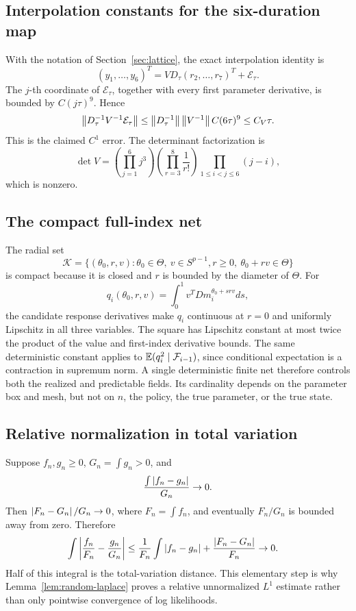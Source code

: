 \subsection{Interpolation constants for the six-duration map}

With the notation of Section~\ref{sec:lattice}, the exact interpolation
identity is
\[
 (y_1,\ldots,y_6)^T
 =VD_\tau(r_2,\ldots,r_7)^T+\mathcal E_\tau.
\]
The \(j\)-th coordinate of \(\mathcal E_\tau\), together with every first
parameter derivative, is bounded by \(C(j\tau)^9\).  Hence
\[
 \left\|D_\tau^{-1}V^{-1}\mathcal E_\tau\right\|
 \le \left\|D_\tau^{-1}\right\|\left\|V^{-1}\right\|C(6\tau)^9
 \le C_V\tau.
\]
This is the claimed \(C^1\) error.  The determinant factorization is
\[
 \det V=\left(\prod_{j=1}^6j^3\right)
 \left(\prod_{r=3}^8\frac1{r!}\right)
 \prod_{1\le i<j\le6}(j-i),
\]
which is nonzero.

\subsection{The compact full-index net}

The radial set
\[
 \mathscr K=\{(\theta_0,r,v):\theta_0\in\Theta,\ v\in S^{p-1},
 r\ge0,\ \theta_0+rv\in\Theta\}
\]
is compact because it is closed and \(r\) is bounded by the diameter of
\(\Theta\).  For
\[
 q_i(\theta_0,r,v)=\int_0^1v^TDm_i^{\theta_0+srv}ds,
\]
the candidate response derivatives make \(q_i\) continuous at \(r=0\) and
uniformly Lipschitz in all three variables.  The square has Lipschitz constant
at most twice the product of the value and first-index derivative bounds.
The same deterministic constant applies to
\(\mathbb E(q_i^2\mid\mathcal F_{i-1})\), since conditional expectation is a contraction in
supremum norm.  A single deterministic finite net therefore controls both the
realized and predictable fields.  Its cardinality depends on the parameter
box and mesh, but not on \(n\), the policy, the true parameter, or the true
state.

\subsection{Relative normalization in total variation}

Suppose \(f_n,g_n\ge0\), \(G_n=\int g_n>0\), and
\[
 \frac{\int\left|f_n-g_n\right|}{G_n}\to0.
\]
Then \(\left|F_n-G_n\right|/G_n\to0\), where \(F_n=\int f_n\), and eventually
\(F_n/G_n\) is bounded away from zero.  Therefore
\begin{align*}
 \int\left|\frac{f_n}{F_n}-\frac{g_n}{G_n}\right|
 &\le \frac1{F_n}\int\left|f_n-g_n\right|
   +\frac{\left|F_n-G_n\right|}{F_n}\to0.
\end{align*}
Half of this integral is the total-variation distance.  This elementary step
is why Lemma~\ref{lem:random-laplace} proves a relative unnormalized
\(L^1\) estimate rather than only pointwise convergence of log likelihoods.


